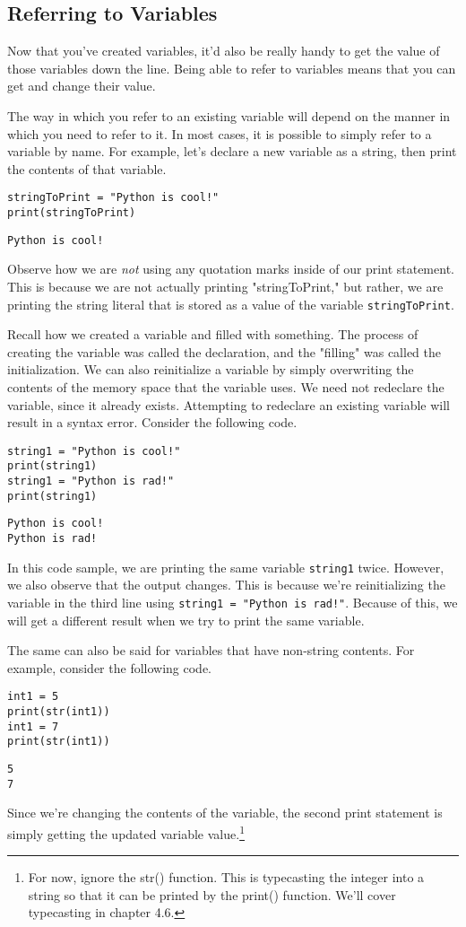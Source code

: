 \subsection{Referring to Variables}
Now that you've created variables, it'd also be really handy to get the value of those variables down the line. Being able to refer to variables means that you can get and change their value.\par
The way in which you refer to an existing variable will depend on the manner in which you need to refer to it. In most cases, it is possible to simply refer to a variable by name. For example, let's declare a new variable as a string, then print the contents of that variable.
\begin{lstlisting}[style=pippython]
stringToPrint = "Python is cool!"
print(stringToPrint)
\end{lstlisting}
\begin{lstlisting}
Python is cool!
\end{lstlisting}
Observe how we are \textit{not} using any quotation marks inside of our print statement. This is because we are not actually printing "stringToPrint," but rather, we are printing the string literal that is stored as a value of the variable \verb|stringToPrint|.\par
Recall how we created a variable and filled with something. The process of creating the variable was called the declaration, and the "filling" was called the initialization. We can also reinitialize a variable by simply overwriting the contents of the memory space that the variable uses. We need not redeclare the variable, since it already exists. Attempting to redeclare an existing variable will result in a syntax error. Consider the following code.\par
\begin{lstlisting}[style=pippython]
string1 = "Python is cool!"
print(string1)
string1 = "Python is rad!"
print(string1)
\end{lstlisting}
\begin{lstlisting}
Python is cool!
Python is rad!
\end{lstlisting}
In this code sample, we are printing the same variable \verb|string1| twice. However, we also observe that the output changes. This is because we're reinitializing the variable in the third line using \verb|string1 = "Python is rad!"|. Because of this, we will get a different result when we try to print the same variable.\par
The same can also be said for variables that have non-string contents. For example, consider the following code.\par
\begin{lstlisting}[style=pippython]
int1 = 5
print(str(int1))
int1 = 7
print(str(int1))
\end{lstlisting}
\begin{lstlisting}
5
7
\end{lstlisting}
Since we're changing the contents of the variable, the second print statement is simply getting the updated variable value.\footnote{For now, ignore the str() function. This is typecasting the integer into a string so that it can be printed by the print() function. We'll cover typecasting in chapter 4.6.}\par
